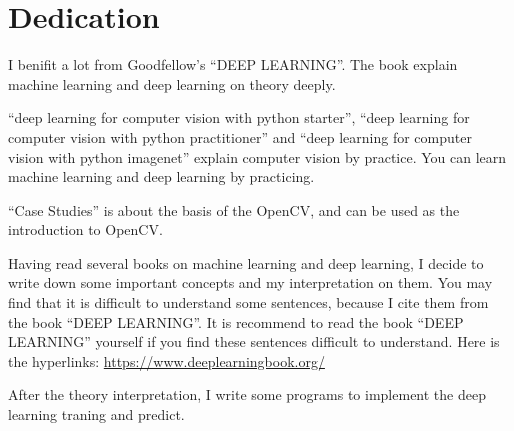 \chapter*{Dedication}
I benifit a lot from Goodfellow's ``DEEP LEARNING''.
The book explain machine learning and deep learning on theory deeply.


``deep learning for computer vision with python starter'',
``deep learning for computer vision with python practitioner'' and
``deep learning for computer vision with python imagenet'' explain computer vision by practice.
You can learn machine learning and deep learning by practicing.


``Case Studies'' is about the basis of the OpenCV, and can be used as the introduction to OpenCV.



Having read several books on machine learning and deep learning, I decide to write down some important concepts and my interpretation on them.
You may find that it is difficult to understand some sentences, because I cite them from the book ``DEEP LEARNING''.
It is recommend to read the book ``DEEP LEARNING'' yourself if you find these sentences difficult to understand.
Here is the hyperlinks: \url{https://www.deeplearningbook.org/}


After the theory interpretation, I write some programs to implement the deep learning traning and predict.



